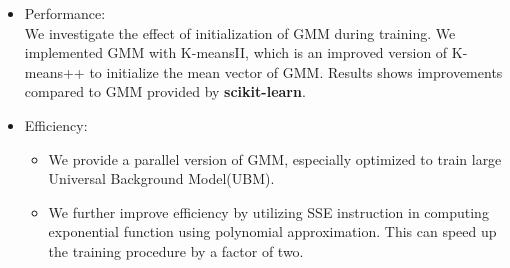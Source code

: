 \begin{itemize}
  \item Performance: \\
    We investigate the effect of initialization of GMM during
    training. We implemented GMM with
    K-meansII\cite{bahmani2012scalable}, which is an improved
    version of K-means++\cite{arthur2007k} to initialize the
    mean vector of GMM. Results shows improvements compared
    to GMM provided by \textbf{scikit-learn\cite{scikit-learn}}.
  \item Efficiency:
    \begin{itemize}
      \item We provide a parallel version of GMM, especially
        optimized to train large Universal Background Model(UBM).
      \item We further improve efficiency by utilizing
        SSE instruction in computing exponential function
        using polynomial approximation. This can speed up
        the training procedure by a factor of two.
    \end{itemize}
\end{itemize}







